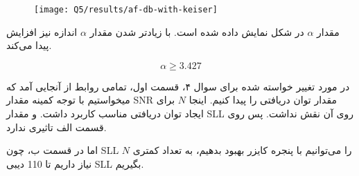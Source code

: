 \documentclass[12pt,onecolumn,a4paper]{article}
\begin{document}
\begin{figure}[H]
	\centering
	\texttt{[image: Q5/results/af-db-with-keiser]}
	\caption{}
	\label{fig:af-db-with-keiser}
\end{figure}
 
 مقدار $\alpha$ در شکل نمایش داده شده است. با زیادتر شدن مقدار $\alpha$ اندازه  نیز افزایش پیدا می‌کند. 
 
 \begin{equation}
 	\alpha \ge 3.427
 \end{equation}
 
 
 
 در مورد تغییر خواسته شده برای سوال ۴، قسمت اول، تمامی روابط از آنجایی آمد که میخواستیم با توجه کمینه مقدار SNR مقدار توان دریافتی را پیدا کنیم. اینجا $N$ برای ایجاد توان دریافتی مناسب کاربرد داشت. و مقدار SLL روی آن نقش نداشت. پس روی قسمت الف تاثیری ندارد.
 
 اما در قسمت ب، چون SLL را می‌توانیم با پنجره کایزر بهبود بدهیم، به تعداد کمتری $N$ نیاز داریم تا 110 دیبی SLL بگیریم.


	\newpage
	
	\nocite{*}
	
	
\end{document}
